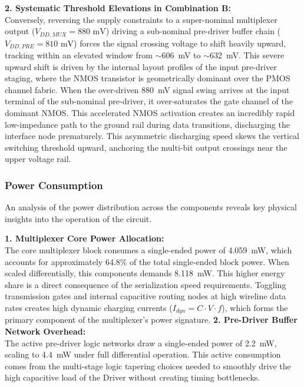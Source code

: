 \textbf{2. Systematic Threshold Elevations in Combination B:} \\
Conversely, reversing the supply constraints to a super-nominal multiplexer output ($V_{DD,MUX} = 880\text{ mV}$) driving a sub-nominal pre-driver buffer chain ($V_{DD,PRE} = 810\text{ mV}$) forces the signal crossing voltage to shift heavily upward, tracking within an elevated window from $\sim$606~mV to $\sim$632~mV. This severe upward shift is driven by the internal layout profiles of the input pre-driver staging, where the NMOS transistor is geometrically dominant over the PMOS channel fabric. When the over-driven 880~mV signal swing arrives at the input terminal of the sub-nominal pre-driver, it over-saturates the gate channel of the dominant NMOS. This accelerated NMOS activation creates an incredibly rapid low-impedance path to the ground rail during data transitions, discharging the interface node prematurely. This asymmetric discharging speed skews the vertical switching threshold upward, anchoring the multi-bit output crossings near the upper voltage rail.

\subsubsection{Power Consumption}

An analysis of the power distribution across the components reveals key physical insights into the operation of the circuit.

\textbf{1. Multiplexer Core Power Allocation:} \\
The core multiplexer block consumes a single-ended power of 4.059~mW, which accounts for approximately 64.8\% of the total single-ended block power. When scaled differentially, this components demands 8.118~mW. This higher energy share is a direct consequence of the serialization speed requirements. Toggling transmission gates and internal capacitive routing nodes at high wireline data rates creates high dynamic charging currents ($I_{dyn} = C \cdot V \cdot f$), which forms the primary component of the multiplexer's power signature.
\clearpage
\textbf{2. Pre-Driver Buffer Network Overhead:} \\
The active pre-driver logic networks draw a single-ended power of 2.2~mW, scaling to 4.4~mW under full differential operation. This active consumption comes from the multi-stage logic tapering choices needed to smoothly drive the high capacitive load of the Driver without creating timing bottlenecks.

